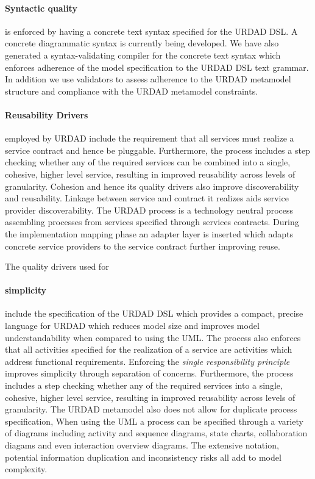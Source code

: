 \paragraph{Syntactic quality} is enforced by having a concrete text syntax specified for the URDAD DSL. A concrete diagrammatic syntax is currently being developed. We have also generated a syntax-validating compiler for the concrete text syntax which enforces adherence of the model specification to the URDAD DSL text grammar. In addition we use validators to assess adherence to the URDAD metamodel structure and compliance with the URDAD metamodel constraints.

\paragraph{Reusability Drivers} employed by URDAD include the requirement that all services must realize a service contract and hence be pluggable. Furthermore, the process includes a step checking whether any of the required services can be combined into a single, cohesive, higher level service, resulting in improved reusability across levels of granularity. Cohesion and hence its quality drivers also improve discoverability and reusability. Linkage between service and contract it realizes aids service provider discoverability. The URDAD process is a technology neutral process assembling processes from services specified through services contracts. During the implementation mapping phase an adapter layer is inserted which adapts concrete service providers to the service contract further improving reuse.

The quality drivers used for \paragraph{simplicity} include the specification of  the URDAD DSL which provides a compact, precise language for URDAD which reduces model size and improves model understandability when compared to using the UML. The process also enforces that all activities specified for the realization of a service are activities which address functional requirements. Enforcing the \emph{single responsibility principle} improves simplicity through separation of concerns. Furthermore, the process includes a step checking whether any of the required services into a single, cohesive, higher level service, resulting in improved reusability across levels of granularity. The URDAD metamodel also does not allow for duplicate process specification, When using the UML a process can be specified through a variety of diagrams including activity and sequence diagrams, state charts, collaboration diagams and even interaction overview diagrams. The extensive notation, potential information duplication and inconsistency risks all add to model complexity.

